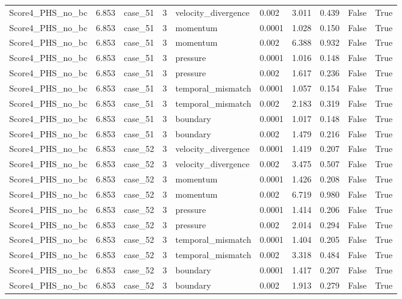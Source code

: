 \begin{longtable}{llllllllll}
Score4\_PHS\_no\_bc & 6.853 & case\_51 & 3 & velocity\_divergence & 0.002 & 3.011 & 0.439 & False & True \\
Score4\_PHS\_no\_bc & 6.853 & case\_51 & 3 & momentum & 0.0001 & 1.028 & 0.150 & False & True \\
Score4\_PHS\_no\_bc & 6.853 & case\_51 & 3 & momentum & 0.002 & 6.388 & 0.932 & False & True \\
Score4\_PHS\_no\_bc & 6.853 & case\_51 & 3 & pressure & 0.0001 & 1.016 & 0.148 & False & True \\
Score4\_PHS\_no\_bc & 6.853 & case\_51 & 3 & pressure & 0.002 & 1.617 & 0.236 & False & True \\
Score4\_PHS\_no\_bc & 6.853 & case\_51 & 3 & temporal\_mismatch & 0.0001 & 1.057 & 0.154 & False & True \\
Score4\_PHS\_no\_bc & 6.853 & case\_51 & 3 & temporal\_mismatch & 0.002 & 2.183 & 0.319 & False & True \\
Score4\_PHS\_no\_bc & 6.853 & case\_51 & 3 & boundary & 0.0001 & 1.017 & 0.148 & False & True \\
Score4\_PHS\_no\_bc & 6.853 & case\_51 & 3 & boundary & 0.002 & 1.479 & 0.216 & False & True \\
Score4\_PHS\_no\_bc & 6.853 & case\_52 & 3 & velocity\_divergence & 0.0001 & 1.419 & 0.207 & False & True \\
Score4\_PHS\_no\_bc & 6.853 & case\_52 & 3 & velocity\_divergence & 0.002 & 3.475 & 0.507 & False & True \\
Score4\_PHS\_no\_bc & 6.853 & case\_52 & 3 & momentum & 0.0001 & 1.426 & 0.208 & False & True \\
Score4\_PHS\_no\_bc & 6.853 & case\_52 & 3 & momentum & 0.002 & 6.719 & 0.980 & False & True \\
Score4\_PHS\_no\_bc & 6.853 & case\_52 & 3 & pressure & 0.0001 & 1.414 & 0.206 & False & True \\
Score4\_PHS\_no\_bc & 6.853 & case\_52 & 3 & pressure & 0.002 & 2.014 & 0.294 & False & True \\
Score4\_PHS\_no\_bc & 6.853 & case\_52 & 3 & temporal\_mismatch & 0.0001 & 1.404 & 0.205 & False & True \\
Score4\_PHS\_no\_bc & 6.853 & case\_52 & 3 & temporal\_mismatch & 0.002 & 3.318 & 0.484 & False & True \\
Score4\_PHS\_no\_bc & 6.853 & case\_52 & 3 & boundary & 0.0001 & 1.417 & 0.207 & False & True \\
Score4\_PHS\_no\_bc & 6.853 & case\_52 & 3 & boundary & 0.002 & 1.913 & 0.279 & False & True \\

\end{longtable}
